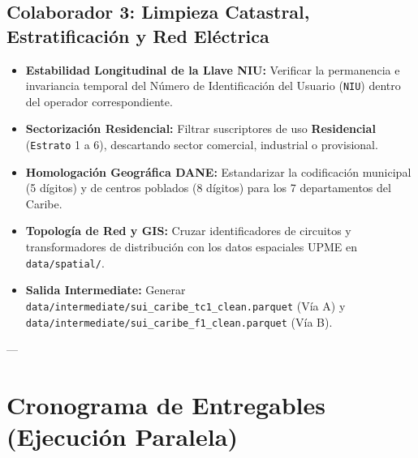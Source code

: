 \documentclass[11pt,a4paper]{article}
\begin{document}
\subsection{Colaborador 3: Limpieza Catastral, Estratificación y Red Eléctrica}
\begin{itemize}
    \item \textbf{Estabilidad Longitudinal de la Llave NIU:} Verificar la permanencia e invariancia temporal del 
    Número de Identificación del Usuario (\texttt{NIU}) dentro del operador correspondiente.
    \item \textbf{Sectorización Residencial:} Filtrar suscriptores de uso \textbf{Residencial} (\texttt{Estrato} 1 a 6), descartando sector comercial, industrial o provisional.
    \item \textbf{Homologación Geográfica DANE:} Estandarizar la codificación municipal (5 dígitos) y de centros poblados (8 dígitos) para los 7 departamentos del Caribe.
    \item \textbf{Topología de Red y GIS:} Cruzar identificadores de circuitos y transformadores de distribución con los datos espaciales UPME en \texttt{data/spatial/}.
    \item \textbf{Salida Intermediate:} Generar \texttt{data/intermediate/sui\_caribe\_tc1\_clean.parquet} (Vía A) y \texttt{data/intermediate/sui\_caribe\_f1\_clean.parquet} (Vía B).
\end{itemize}

---

\section{Cronograma de Entregables (Ejecución Paralela)}
\end{document}
